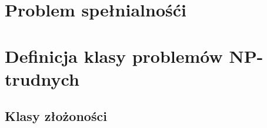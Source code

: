 \section{Problem spełnialnośći}

\section{Definicja klasy problemów NP-trudnych}

\subsection{Klasy złożoności}



